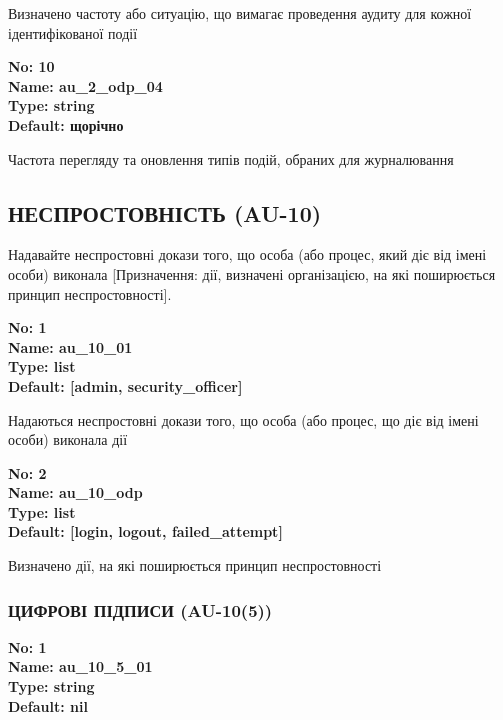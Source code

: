\documentclass{article}
\begin{document}
{\footnotesize Визначено частоту або ситуацію, що вимагає проведення аудиту для кожної ідентифікованої події}


{\footnotesize\bfseries
No: 10\\
Name: au\_\allowbreak{}2\_\allowbreak{}odp\_\allowbreak{}04\\
Type: string\\
Default: \textquotedbl{}щорічно\textquotedbl{}
}

{\footnotesize Частота перегляду та оновлення типів подій, обраних для журналювання}




\subsection{НЕСПРОСТОВНІСТЬ (AU-10)}
Надавайте неспростовні докази того, що особа (або процес, який діє від імені особи) виконала [Призначення: дії, визначені організацією, на які поширюється принцип неспростовності].

\vspace{10pt}
{\footnotesize\bfseries
No: 1\\
Name: au\_\allowbreak{}10\_\allowbreak{}01\\
Type: list\\
Default: [\textquotedbl{}admin\textquotedbl{}, \textquotedbl{}security\_\allowbreak{}officer\textquotedbl{}]
}

{\footnotesize Надаються неспростовні докази того, що особа (або процес, що діє від імені особи) виконала дії}


{\footnotesize\bfseries
No: 2\\
Name: au\_\allowbreak{}10\_\allowbreak{}odp\\
Type: list\\
Default: [\textquotedbl{}login\textquotedbl{}, \textquotedbl{}logout\textquotedbl{}, \textquotedbl{}failed\_\allowbreak{}attempt\textquotedbl{}]
}

{\footnotesize Визначено дії, на які поширюється принцип неспростовності}




\subsubsection{ЦИФРОВІ ПІДПИСИ (AU-10(5))}


\vspace{10pt}
{\footnotesize\bfseries
No: 1\\
Name: au\_\allowbreak{}10\_\allowbreak{}5\_\allowbreak{}01\\
Type: string\\
Default: nil
}
\end{document}
